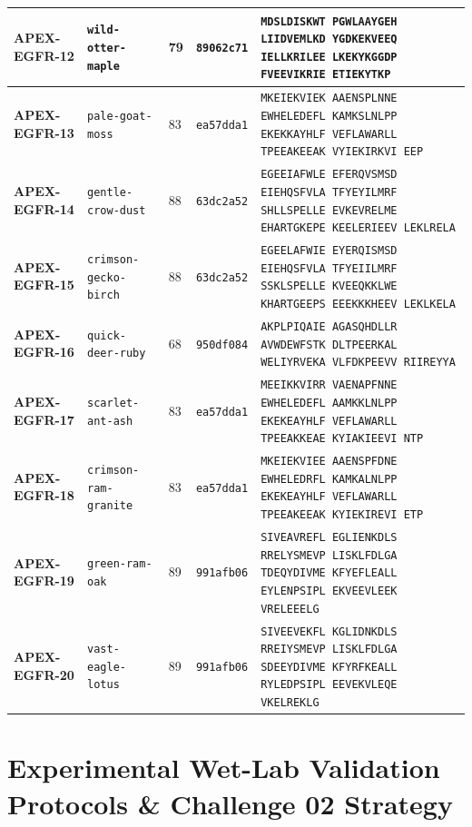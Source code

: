 \documentclass[11pt]{article}
\begin{document}
\begin{table}[htbp]
\begin{tabularx}{\textwidth}{llp{0.8cm}p{1.3cm}X}
\textbf{APEX-EGFR-12} & \texttt{wild-otter-maple} & 79 & \texttt{89062c71} & \texttt{MDSLDISKWT PGWLAAYGEH LIIDVEMLKD YGDKEKVEEQ IELLKRILEE LKEKYKGGDP FVEEVIKRIE ETIEKYTKP} \\ \midrule
\textbf{APEX-EGFR-13} & \texttt{pale-goat-moss} & 83 & \texttt{ea57dda1} & \texttt{MKEIEKVIEK AAENSPLNNE EWHELEDEFL KAMKSLNLPP EKEKKAYHLF VEFLAWARLL TPEEAKEEAK VYIEKIRKVI EEP} \\ \midrule
\textbf{APEX-EGFR-14} & \texttt{gentle-crow-dust} & 88 & \texttt{63dc2a52} & \texttt{EGEEIAFWLE EFERQVSMSD EIEHQSFVLA TFYEYILMRF SHLLSPELLE EVKEVRELME EHARTGKEPE KEELERIEEV LEKLRELA} \\ \midrule
\textbf{APEX-EGFR-15} & \texttt{crimson-gecko-birch} & 88 & \texttt{63dc2a52} & \texttt{EGEELAFWIE EYERQISMSD EIEHQSFVLA TFYEIILMRF SSKLSPELLE KVEEQKKLWE KHARTGEEPS EEEKKKHEEV LEKLKELA} \\ \midrule
\textbf{APEX-EGFR-16} & \texttt{quick-deer-ruby} & 68 & \texttt{950df084} & \texttt{AKPLPIQAIE AGASQHDLLR AVWDEWFSTK DLTPEERKAL WELIYRVEKA VLFDKPEEVV RIIREYYA} \\ \midrule
\textbf{APEX-EGFR-17} & \texttt{scarlet-ant-ash} & 83 & \texttt{ea57dda1} & \texttt{MEEIKKVIRR VAENAPFNNE EWHELEDEFL AAMKKLNLPP EKEKEAYHLF VEFLAWARLL TPEEAKKEAE KYIAKIEEVI NTP} \\ \midrule
\textbf{APEX-EGFR-18} & \texttt{crimson-ram-granite} & 83 & \texttt{ea57dda1} & \texttt{MKEIEKVIEE AAENSPFDNE EWHELEDRFL KAMKALNLPP EKEKEAYHLF VEFLAWARLL TPEEAKEEAK KYIEKIREVI ETP} \\ \midrule
\textbf{APEX-EGFR-19} & \texttt{green-ram-oak} & 89 & \texttt{991afb06} & \texttt{SIVEAVREFL EGLIENKDLS RRELYSMEVP LISKLFDLGA TDEQYDIVME KFYEFLEALL EYLENPSIPL EKVEEVLEEK VRELEEELG} \\ \midrule
\textbf{APEX-EGFR-20} & \texttt{vast-eagle-lotus} & 89 & \texttt{991afb06} & \texttt{SIVEEVEKFL KGLIDNKDLS RREIYSMEVP LISKLFDLGA SDEEYDIVME KFYRFKEALL RYLEDPSIPL EEVEKVLEQE VKELREKLG} \\ \midrule
\bottomrule
\end{tabularx}
\end{table}

\section{Experimental Wet-Lab Validation Protocols \& Challenge 02 Strategy}
\end{document}
